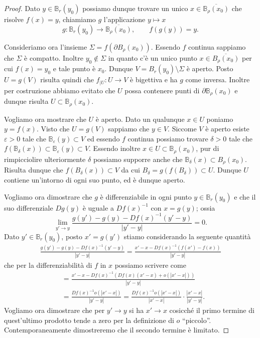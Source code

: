 \documentclass[italian]{article}
\theoremstyle{remark}
\newcommand{\B}{{\mathbb B}}  %
\renewcommand{\epsilon}{{\varepsilon}}  %
\begin{document}
\begin{proof}
Dato $y\in \B_r(y_0)$ possiamo dunque trovare un unico 
$x\in \overline{\B_\rho(x_0)}$ che risolve $f(x)=y$, chiamiamo
$g$ l'applicazione $y\mapsto x$
        \[
        g\colon \B_r(y_0) \to \overline{\B_\rho(x_0)}, \qquad f(g(y))=y.
        \]

Consideriamo ora l'insieme $\Sigma = f(\partial B_\rho(x_0))$. Essendo
$f$ continua sappiamo che $\Sigma$ è compatto.
Inoltre $y_0 \not \in \Sigma$ in quanto c'è un unico punto
$x\in \overline{B_\rho(x_0)}$ per cui $f(x)=y_0$ e tale punto è $x_0$.
Dunque $V = B_r(y_0)\setminus \Sigma$ è aperto.
Posto $U = g(V)$
risulta quindi che $f_{|U}\colon U\to V$ \`e
bigettiva e ha $g$ come inversa.
Inoltre per costruzione abbiamo evitato che $U$ possa contenere punti
di $\partial \B_\rho(x_0)$ e dunque risulta $U \subset \B_\rho(x_0)$.

Vogliamo ora mostrare che $U$ è aperto.
Dato un qualunque $x \in U$ poniamo $y= f(x)$. Visto
che $U=g(V)$ sappiamo che $y \in V$. Siccome $V$ è aperto esiste
$\epsilon>0$ tale che $\B_\epsilon(y)\subset V$
ed essendo $f$
continua possiamo trovare $\delta>0$ tale che
$f(\B_\delta(x)) \subset \B_\epsilon(y) \subset V$.
Essendo inoltre $x\in U \subset \B_\rho(x_0)$, pur di rimpicciolire
ulteriormente $\delta$ possiamo supporre anche che
$\B_\delta(x)\subset B_\rho(x_0)$.
Risulta dunque che $f(B_\delta(x))\subset V$ da cui $B_\delta
=g(f(B_\delta)) \subset U$.
Dunque $U$ contiene un'intorno
di ogni suo punto, ed è dunque aperto.


Vogliamo ora dimostrare che $g$ \`e differenziabile in ogni punto
$y\in \B_r(y_0)$ e che il suo differenziale $Dg(y)$ \`e uguale a
$Df(x)^{-1}$ con $x=g(y)$; ossia
\[
\lim_{y'\to y} \frac{g(y')-g(y) - Df(x)^{-1}(y'-y)}{|y'-y|}=0.
\]
Dato $y'\in \B_r(y_0)$, posto $x'=g(y')$ stiamo considerando la
seguente quantit\`a
\begin{align*}
\frac{g(y')-g(y) - Df(x)^{-1}(y'-y)}{|y'-y|} 
=
\frac{x'-x - Df(x)^{-1}(f(x')-f(x))}{|y'-y|}
\end{align*}
che per la differenziabilit\`a di $f$ in $x$ possiamo scrivere come
\begin{equation}
\label{eq_inv_diff}
\begin{aligned}
&=
\frac{x'-x - Df(x)^{-1}(Df(x)(x'-x)+o(|x'-x|))}{|y'-y|}\\
&=
\frac{Df(x)^{-1} o(|x'-x|)}{|y'-y|}
=
\frac{Df(x)^{-1} o(|x'-x|)}{|x'-x|}\cdot \frac{|x'-x|}{|y'-y|}.
\end{aligned}
\end{equation}
Vogliamo ora dimostrare che per $y'\to y$ si ha $x'\to x$ cosicch\'e 
il primo termine di quest'ultimo prodotto tende
a zero per la definizione di $o$ ``piccolo''. Contemporaneamente 
dimostreremo che il secondo termine \`e limitato.


\end{proof}
\end{document}
